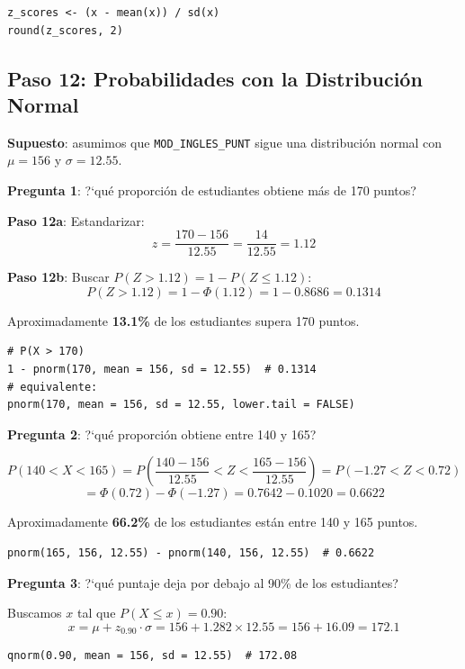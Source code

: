 \documentclass[11pt, a4paper]{article}
\begin{document}
\begin{lstlisting}
z_scores <- (x - mean(x)) / sd(x)
round(z_scores, 2)
\end{lstlisting}

\subsection{Paso 12: Probabilidades con la Distribuci\'on Normal}

\textbf{Supuesto}: asumimos que \texttt{MOD\_INGLES\_PUNT} sigue una distribuci\'on normal
con $\mu = 156$ y $\sigma = 12.55$.

\textbf{Pregunta 1}: ?`qu\'e proporci\'on de estudiantes obtiene m\'as de 170 puntos?

\textbf{Paso 12a}: Estandarizar:
\[
z = \frac{170 - 156}{12.55} = \frac{14}{12.55} = 1.12
\]

\textbf{Paso 12b}: Buscar $P(Z > 1.12) = 1 - P(Z \leq 1.12)$:
\[
P(Z > 1.12) = 1 - \Phi(1.12) = 1 - 0.8686 = \boxed{0.1314}
\]

Aproximadamente \textbf{13.1\%} de los estudiantes supera 170 puntos.

\begin{lstlisting}
# P(X > 170)
1 - pnorm(170, mean = 156, sd = 12.55)  # 0.1314
# equivalente:
pnorm(170, mean = 156, sd = 12.55, lower.tail = FALSE)
\end{lstlisting}

\textbf{Pregunta 2}: ?`qu\'e proporci\'on obtiene entre 140 y 165?

\[
P(140 < X < 165) = P\!\left(\frac{140-156}{12.55} < Z < \frac{165-156}{12.55}\right)
= P(-1.27 < Z < 0.72)
\]
\[
= \Phi(0.72) - \Phi(-1.27) = 0.7642 - 0.1020 = \boxed{0.6622}
\]

Aproximadamente \textbf{66.2\%} de los estudiantes est\'an entre 140 y 165 puntos.

\begin{lstlisting}
pnorm(165, 156, 12.55) - pnorm(140, 156, 12.55)  # 0.6622
\end{lstlisting}

\textbf{Pregunta 3}: ?`qu\'e puntaje deja por debajo al 90\% de los estudiantes?

Buscamos $x$ tal que $P(X \leq x) = 0.90$:
\[
x = \mu + z_{0.90} \cdot \sigma = 156 + 1.282 \times 12.55 = 156 + 16.09 = \boxed{172.1}
\]

\begin{lstlisting}
qnorm(0.90, mean = 156, sd = 12.55)  # 172.08
\end{lstlisting}
\end{document}
